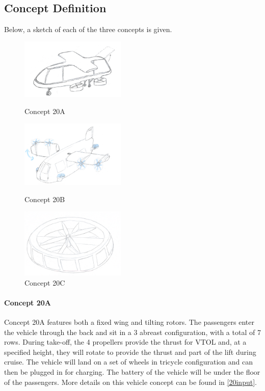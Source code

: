 \subsection{Concept Definition}
\label{ssc:Conceptdef20}
Below, a sketch of each of the three concepts is given.  

\begin{figure}[H]
  \centering
  \begin{minipage}[b]{0.25\textwidth}
    \includegraphics[width=5.0cm]{./Figures/Concept_20A.png}
    \captionsetup{justification=centering}
    \caption{Concept 20A}
    \label{concept20a}
  \end{minipage}
  \hspace{1.25cm}
  \begin{minipage}[b]{0.25\textwidth}
    \includegraphics[width=5.0cm]{./Figures/Concept_20B.png}
    \captionsetup{justification=centering}
    \caption{Concept 20B}
    \label{concept20b}
  \end{minipage}
  \hspace{1.25cm}
  \begin{minipage}[b]{0.25\textwidth}
    \includegraphics[width=5.0cm]{./Figures/Concept_20D.png}
    \captionsetup{justification=centering}
    \caption{Concept 20C}
    \label{concept20c}
  \end{minipage}
\end{figure}

\paragraph{Concept 20A}
Concept 20A features both a fixed wing and tilting rotors. The passengers enter the vehicle through the back and sit in a 3 abreast configuration, with a total of 7 rows. During take-off, the 4 propellers provide the thrust for VTOL and, at a specified height, they will rotate to provide the thrust and part of the lift during cruise. The vehicle will land on a set of wheels in tricycle configuration and can then be plugged in for charging. The battery of the vehicle will be under the floor of the passengers. More details on this vehicle concept can be found in \autoref{20input}.  

